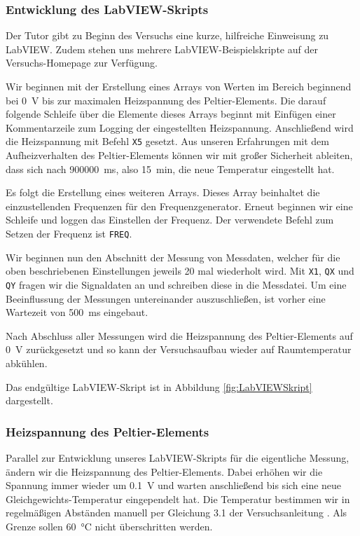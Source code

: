 \endminipage

\subsubsection*{Entwicklung des LabVIEW-Skripts}

Der Tutor gibt zu Beginn des Versuchs eine kurze, hilfreiche Einweisung zu LabVIEW.
Zudem stehen uns mehrere LabVIEW-Beispielskripte auf der Versuchs-Homepage zur Verfügung.

Wir beginnen mit der Erstellung eines Arrays von Werten im Bereich beginnend bei \SI{0}{\volt} bis zur maximalen Heizspannung des Peltier-Elements.
Die darauf folgende Schleife über die Elemente dieses Arrays beginnt mit Einfügen einer Kommentarzeile zum Logging der eingestellten Heizspannung.
Anschließend wird die Heizspannung mit Befehl \texttt{X5} gesetzt.
Aus unseren Erfahrungen mit dem Aufheizverhalten des Peltier-Elements können wir mit großer Sicherheit ableiten, dass sich nach \SI{900000}{\milli\second}, also \SI{15}{\minute}, die neue Temperatur eingestellt hat.

Es folgt die Erstellung eines weiteren Arrays.
Dieses Array beinhaltet die einzustellenden Frequenzen für den Frequenzgenerator.
Erneut beginnen wir eine Schleife und loggen das Einstellen der Frequenz.
Der verwendete Befehl zum Setzen der Frequenz ist \texttt{FREQ}.

Wir beginnen nun den Abschnitt der Messung von Messdaten, welcher für die oben beschriebenen Einstellungen jeweils 20 mal wiederholt wird.
Mit \texttt{X1}, \texttt{QX} und \texttt{QY} fragen wir die Signaldaten an und schreiben diese in die Messdatei.
Um eine Beeinflussung der Messungen untereinander auszuschließen, ist vorher eine Wartezeit von \SI{500}{\milli\second} eingebaut.

Nach Abschluss aller Messungen wird die Heizspannung des Peltier-Elements auf \SI{0}{\volt} zurückgesetzt und so kann der Versuchsaufbau wieder auf Raumtemperatur abkühlen.

Das endgültige LabVIEW-Skript ist in Abbildung \ref{fig:LabVIEWSkript} dargestellt.

\subsubsection*{Heizspannung des Peltier-Elements}

Parallel zur Entwicklung unseres LabVIEW-Skripts für die eigentliche Messung, ändern wir die Heizspannung des Peltier-Elements.
Dabei erhöhen wir die Spannung immer wieder um \SI{0.1}{\volt} und warten anschließend bis sich eine neue Gleichgewichts-Temperatur eingependelt hat.
Die Temperatur bestimmen wir in regelmäßigen Abständen manuell per Gleichung 3.1 der Versuchsanleitung \cite{Anleitung}.
Als Grenze sollen \SI{60}{\celsius} nicht überschritten werden.

